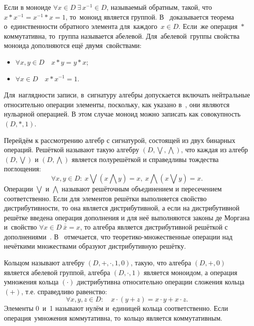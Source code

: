 Если в моноиде $\forall x\in D\ \exists \,x^{-1}\in D$, называемый обратным, такой, что~$x*{{x}^{-1}}={{x}^{-1}}*x=1$, то~моноид является группой. В~\cite{Bauman_DM, Adelson_Velskiy, Voevodin} доказывается теорема о~единственности обратного элемента для~каждого~$x\in D$. Если~же операция~$*$ коммутативна, то~группа называется абелевой. Для~абелевой~группы свойства моноида дополняются ещё двумя~свойствами:
\begin{itemize}
	\item $\forall x,y\in D\quad x*y=y*x$;
	\item $\forall x\in D\quad x*{{x}^{-1}}=1$.
\end{itemize}

Для~наглядности записи, в~сигнатуру алгебры допускается включать нейтральные относительно операции элементы, поскольку, как указано в~\cite{Bauman_DM}, они являются нульарной операцией. В этом случае моноид можно записать как совокупность $\left( D,*,1 \right)$.

Перейдём к рассмотрению алгебр с сигнатурой, состоящей из двух бинарных операций. Решёткой называют такую алгебру $\left( D, \bigvee, \bigwedge \right)$, что каждая из алгебр $\left( D, \bigvee\right)$ и $\left( D, \bigwedge \right)$ является полурешёткой и справедливы тождества поглощения:
\begin{equation*}
  \forall x,y\in D:\ x \bigvee \left( x \bigwedge y \right) = x,\ x \bigwedge \left(x \bigvee y \right) = x.
\end{equation*}
Операции $\bigvee$ и $\bigwedge$ называют решёточным объединением и пересечением соответственно. Если для элементов решётки выполняется свойство дистрибутивности, то она является дистрибутивной, а если на дистрибутивной решётке введена операция дополнения и для неё выполняются законы де Моргана и~свойство $\forall x\in D\ \overline{\bar x}=x$, то алгебра является дистрибутивной решёткой с дополнениями~\cite{Lipetsk}. В~\cite{Kaufmann, Pospelov} отмечается, что теоретико-множественные операции над нечёткими множествами образуют дистрибутивную решётку.

Кольцом называют алгебру $\left( D,+,\cdot ,1,0 \right)$, такую, что алгебра $\left( D,+,0 \right)$ является абелевой группой, алгебра $\left( D,\cdot ,1 \right)$ является моноидом, а операция умножения кольца $\left( \cdot  \right)$ дистрибутивна относительно операции сложения кольца $\left( + \right)$, т.е. справедливо равенство:
\begin{equation*}
	\forall x,y,z\in D:\quad x\cdot \left( y+z \right)=x\cdot y+x\cdot z.
\end{equation*}
Элементы 0~и~1 называют нулём и~единицей кольца соответственно. Если операция~умножения коммутативна, то~кольцо является коммутативным.

